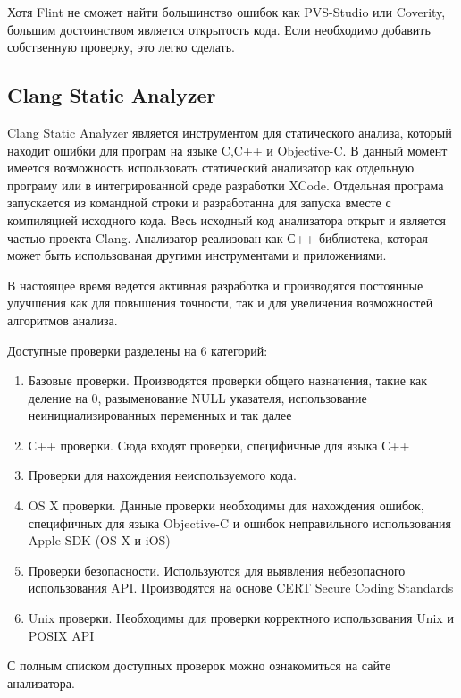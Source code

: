 Хотя Flint не сможет найти большинство ошибок как PVS-Studio или Coverity, большим достоинством
является открытость кода. Если необходимо добавить собственную проверку, это легко сделать.
  
\subsection{Clang Static Analyzer}
Clang Static Analyzer является инструментом для статического анализа, который находит ошибки
для програм на языке C,C++ и Objective-C. В данный момент имеется возможность использовать 
статический анализатор как отдельную програму или в интегрированной среде разработки XCode.
Отдельная програма запускается из командной строки и разработанна для запуска вместе с компиляцией
исходного кода. Весь исходный код анализатора открыт и является частью проекта Clang. 
Анализатор реализован как С++ библиотека, которая может быть использованая другими инструментами и приложениями.
 
В настоящее время ведется активная разработка и производятся постоянные улучшения как для повышения точности, 
так и для увеличения возможностей алгоритмов анализа. 

Доступные проверки разделены на 6 категорий: 
\begin{enumerate}
	\item Базовые проверки. Производятся проверки общего назначения, такие как деление на 0, 
разыменование NULL указателя, использование неинициализированных переменных и так далее
	\item С++ проверки. Сюда входят проверки, специфичные для языка С++
	\item Проверки для нахождения неиспользуемого кода.
	\item OS X проверки. Данные проверки необходимы для нахождения ошибок, специфичных для 
языка Objective-C и ошибок неправильного использования Apple SDK (OS X и iOS)
	\item Проверки безопасности. Используются для выявления небезопасного использования API. 
Производятся на основе CERT Secure Coding Standards 
	\item Unix проверки. Необходимы для проверки корректного использования Unix и POSIX API
\end{enumerate}
С полным списком доступных проверок можно ознакомиться на сайте анализатора.
